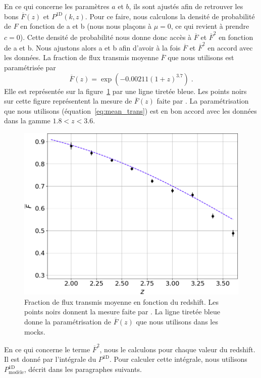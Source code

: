 En ce qui concerne les paramètres $a$ et $b$, ils sont ajustés afin de retrouver les bons $\overline F(z)$ et $P^{\mathrm{1D}}(k, z)$.
Pour ce faire, nous calculons la densité de probabilité de $F$ en fonction de a et b (nous nous plaçons à $\mu = 0$, ce qui revient à prendre $c = 0$).
Cette densité de probabilité nous donne donc accès à $\overline F$ et $\overline F^2$ en fonction de a et b. Nous ajustons alors a et b afin d'avoir à la fois $\overline F$ et $\overline F^2$ en accord avec les données. La fraction de flux transmis moyenne $\overline F$ que nous utilisons est paramétrisée par
\begin{equation}
  \label{eq:mean_trans}
  \overline F(z) = \exp(-0.00211 (1+z)^{3.7}) \;.
\end{equation}
Elle est représentée sur la figure~\ref{fig:mean_trans} par une ligne tiretée bleue. Les points noirs sur cette figure représentent la mesure de $\overline F(z)$  faite par \textcite{Faucher-Giguere2008}. La paramétrisation que nous utilisons (équation~\ref{eq:mean_trans}) est en bon accord avec les données dans la gamme $\num{1.8} < z < \num{3.6}$.
\begin{figure}
  \centering
  \includegraphics[scale=0.4]{mean_trans}
  \caption{Fraction de flux transmis moyenne en fonction du redshift. Les points noirs donnent la mesure faite par \textcite{Faucher-Giguere2008}. La ligne tiretée bleue donne la paramétrisation de $\overline F(z)$ que nous utilisons dans les mocks.}
  \label{fig:mean_trans}
\end{figure}
En ce qui concerne le terme $\overline F^2$, nous le calculons pour chaque valeur du redshift. Il est donné par l'intégrale du $P^{\mathrm{1D}}$. Pour calculer cette intégrale, nous utilisons $P^{\mathrm{1D}}_{\mathrm{modèle}}$, décrit dans les paragraphes suivants.



